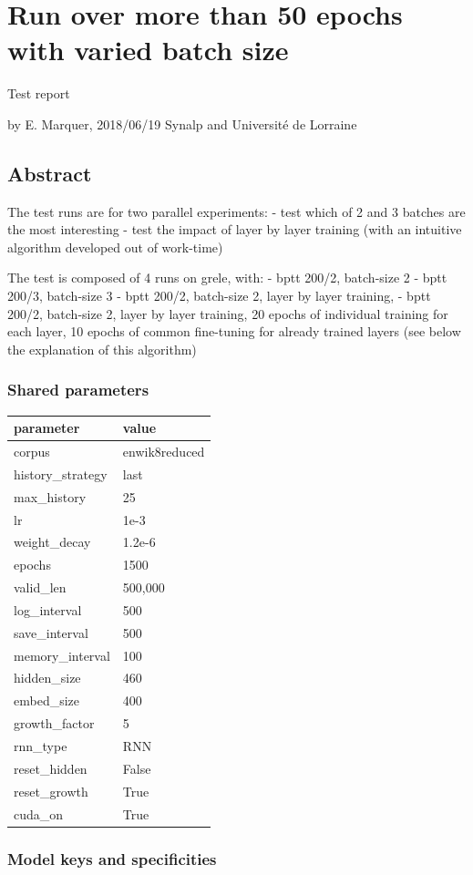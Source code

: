 \section{Run over more than 50 epochs with varied batch
size}\label{run-over-more-than-50-epochs-with-varied-batch-size}

Test report

by E. Marquer, 2018/06/19 Synalp and Université de Lorraine

\subsection{Abstract}\label{abstract}

The test runs are for two parallel experiments: - test which of 2 and 3
batches are the most interesting - test the impact of layer by layer
training (with an intuitive algorithm developed out of work-time)

The test is composed of 4 runs on grele, with: - bptt 200/2, batch-size
2 - bptt 200/3, batch-size 3 - bptt 200/2, batch-size 2, layer by layer
training, - bptt 200/2, batch-size 2, layer by layer training, 20 epochs
of individual training for each layer, 10 epochs of common fine-tuning
for already trained layers (see below the explanation of this algorithm)

\subsubsection{Shared parameters}\label{shared-parameters}

\begin{longtable}[]{@{}ll@{}}
\toprule
parameter & value\tabularnewline
\midrule
\endhead
corpus & enwik8reduced\tabularnewline
history\_strategy & last\tabularnewline
max\_history & 25\tabularnewline
lr & 1e-3\tabularnewline
weight\_decay & 1.2e-6\tabularnewline
epochs & 1500\tabularnewline
valid\_len & 500,000\tabularnewline
log\_interval & 500\tabularnewline
save\_interval & 500\tabularnewline
memory\_interval & 100\tabularnewline
hidden\_size & 460\tabularnewline
embed\_size & 400\tabularnewline
growth\_factor & 5\tabularnewline
rnn\_type & RNN\tabularnewline
reset\_hidden & False\tabularnewline
reset\_growth & True\tabularnewline
cuda\_on & True\tabularnewline
\bottomrule
\end{longtable}

\subsubsection{Model keys and
specificities}\label{model-keys-and-specificities}

